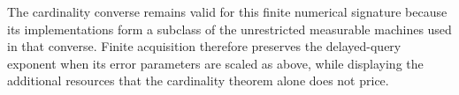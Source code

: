 The cardinality converse remains valid for this finite numerical
signature because its implementations form a subclass of the
unrestricted measurable machines used in that converse. Finite
acquisition therefore preserves the delayed-query exponent when
its error parameters are scaled as above, while displaying the
additional resources that the cardinality theorem alone does not
price.

